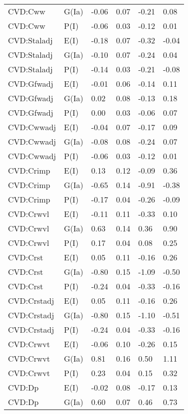\begin{center}
\begin{longtable}{|p{1.1in}|p{0.7in}|p{0.7in}|p{0.6in}|p{0.6in}|p{0.6in}|}
  CVD:Cww & G(Ia) & -0.06 & 0.07 & -0.21 & 0.08 \\ 
  CVD:Cww & P(I) & -0.06 & 0.03 & -0.12 & 0.01 \\ 
  CVD:Staladj & E(I) & -0.18 & 0.07 & -0.32 & -0.04 \\ 
  CVD:Staladj & G(Ia) & -0.10 & 0.07 & -0.24 & 0.04 \\ 
  CVD:Staladj & P(I) & -0.14 & 0.03 & -0.21 & -0.08 \\ 
  CVD:Gfwadj & E(I) & -0.01 & 0.06 & -0.14 & 0.11 \\ 
  CVD:Gfwadj & G(Ia) & 0.02 & 0.08 & -0.13 & 0.18 \\ 
  CVD:Gfwadj & P(I) & 0.00 & 0.03 & -0.06 & 0.07 \\ 
  CVD:Cwwadj & E(I) & -0.04 & 0.07 & -0.17 & 0.09 \\ 
  CVD:Cwwadj & G(Ia) & -0.08 & 0.08 & -0.24 & 0.07 \\ 
  CVD:Cwwadj & P(I) & -0.06 & 0.03 & -0.12 & 0.01 \\ 
  CVD:Crimp & E(I) & 0.13 & 0.12 & -0.09 & 0.36 \\ 
  CVD:Crimp & G(Ia) & -0.65 & 0.14 & -0.91 & -0.38 \\ 
  CVD:Crimp & P(I) & -0.17 & 0.04 & -0.26 & -0.09 \\ 
  CVD:Crwvl & E(I) & -0.11 & 0.11 & -0.33 & 0.10 \\ 
  CVD:Crwvl & G(Ia) & 0.63 & 0.14 & 0.36 & 0.90 \\ 
  CVD:Crwvl & P(I) & 0.17 & 0.04 & 0.08 & 0.25 \\ 
  CVD:Crst & E(I) & 0.05 & 0.11 & -0.16 & 0.26 \\ 
  CVD:Crst & G(Ia) & -0.80 & 0.15 & -1.09 & -0.50 \\ 
  CVD:Crst & P(I) & -0.24 & 0.04 & -0.33 & -0.16 \\ 
  CVD:Crstadj & E(I) & 0.05 & 0.11 & -0.16 & 0.26 \\ 
  CVD:Crstadj & G(Ia) & -0.80 & 0.15 & -1.10 & -0.51 \\ 
  CVD:Crstadj & P(I) & -0.24 & 0.04 & -0.33 & -0.16 \\ 
  CVD:Crwvt & E(I) & -0.06 & 0.10 & -0.26 & 0.15 \\ 
  CVD:Crwvt & G(Ia) & 0.81 & 0.16 & 0.50 & 1.11 \\ 
  CVD:Crwvt & P(I) & 0.23 & 0.04 & 0.15 & 0.32 \\ 
  CVD:Dp & E(I) & -0.02 & 0.08 & -0.17 & 0.13 \\ 
  CVD:Dp & G(Ia) & 0.60 & 0.07 & 0.46 & 0.73 \\ 

\end{longtable}
\end{center}
